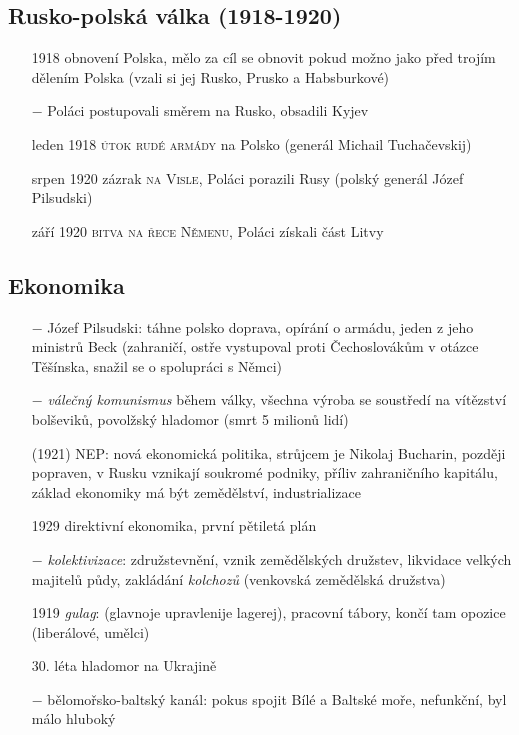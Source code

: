 \documentclass{article}
\begin{document}
\subsection*{Rusko-polská válka (1918-1920)}
\begin{itemize}
    \vspace{-0.5em}
    \setlength\itemsep{0.15em}
    \item[1918] obnovení Polska, mělo za cíl se obnovit pokud možno jako před trojím dělením Polska (vzali si jej Rusko, Prusko a Habsburkové)
    \item[$-$] Poláci postupovali směrem na Rusko, obsadili Kyjev
    \item[leden 1918] \textsc{útok rudé armády} na Polsko (generál Michail Tuchačevskij)
    \item[srpen 1920] zázrak \textsc{na Visle}, Poláci porazili Rusy (polský generál Józef Pilsudski)
    \item[září 1920] \textsc{bitva na řece Němenu}, Poláci získali část Litvy
\end{itemize}

\subsection*{Ekonomika}
\begin{itemize}
    \vspace{-0.5em}
    \setlength\itemsep{0.15em}
    \item[$-$] Józef Pilsudski: táhne polsko doprava, opírání o armádu, jeden z jeho ministrů Beck (zahraničí, ostře vystupoval proti Čechoslovákům v otázce Těšínska, snažil se o spolupráci s Němci)
    \item[$-$] \textit{válečný komunismus} během války, všechna výroba se soustředí na vítězství bolševiků, povolžský hladomor (smrt 5 milionů lidí)
    \item[(1921)] NEP: nová ekonomická politika, strůjcem je Nikolaj Bucharin, později popraven, v Rusku vznikají soukromé podniky, příliv zahraničního kapitálu, základ ekonomiky má být zemědělství, industrializace
    \item[1929] direktivní ekonomika, první pětiletá plán
    \item[$-$] \textit{kolektivizace}: združstevnění, vznik zemědělských družstev, likvidace velkých majitelů půdy, zakládání \textit{kolchozů} (venkovská zemědělská družstva)
    \item[1919] \textit{gulag}: (glavnoje upravlenije lagerej), pracovní tábory, končí tam opozice (liberálové, umělci)
    \item[30. léta] hladomor na Ukrajině
    \item[$-$] bělomořsko-baltský kanál: pokus spojit Bílé a Baltské moře, nefunkční, byl málo hluboký
\end{itemize}
\end{document}
